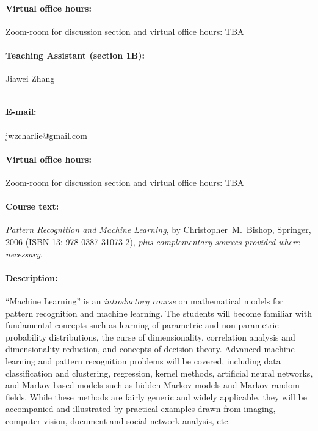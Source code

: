 \documentclass[11pt,letter]{article}
\begin{document}
\paragraph{Virtual office hours:}
Zoom-room for discussion section and virtual office hours:  TBA\\

\paragraph{Teaching Assistant (section 1B):} Jiawei Zhang\hrule
\paragraph{E-mail:} jwzcharlie@gmail.com
\paragraph{Virtual office hours:}
Zoom-room for discussion section and virtual office hours:  TBA\\


\paragraph{Course text:} \emph{Pattern Recognition and Machine Learning}, by Christopher~M.~Bishop, Springer, 2006 (ISBN-13: 978-0387-31073-2),
\emph{plus complementary sources provided where necessary}.

\paragraph{Description:} ``Machine Learning'' is an \emph{introductory course} on mathematical models for pattern recognition and machine learning. The students will become familiar with fundamental concepts such as learning of parametric and non-parametric probability distributions, the curse of dimensionality, correlation analysis and dimensionality reduction,  and concepts of decision theory. Advanced machine learning and pattern recognition problems will be covered, including data classification and clustering, regression, kernel methods, artificial neural networks, and Markov-based models such as hidden Markov models and Markov random fields. While these methods are fairly generic and widely applicable, they will be accompanied and illustrated by practical examples drawn from imaging, computer vision, document and social network analysis, etc.
\end{document}
